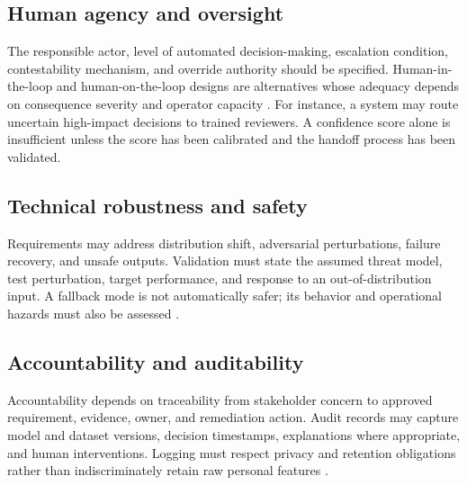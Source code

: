 \documentclass[11pt,a4paper]{article}
\begin{document}
\subsection{Human agency and oversight}
The responsible actor, level of automated decision-making, escalation condition, contestability mechanism, and override authority should be specified. Human-in-the-loop and human-on-the-loop designs are alternatives whose adequacy depends on consequence severity and operator capacity \cite{hleg2019}. For instance, a system may route uncertain high-impact decisions to trained reviewers. A confidence score alone is insufficient unless the score has been calibrated and the handoff process has been validated.

\subsection{Technical robustness and safety}
Requirements may address distribution shift, adversarial perturbations, failure recovery, and unsafe outputs. Validation must state the assumed threat model, test perturbation, target performance, and response to an out-of-distribution input. A fallback mode is not automatically safer; its behavior and operational hazards must also be assessed \cite{zhang2020}.

\subsection{Accountability and auditability}
Accountability depends on traceability from stakeholder concern to approved requirement, evidence, owner, and remediation action. Audit records may capture model and dataset versions, decision timestamps, explanations where appropriate, and human interventions. Logging must respect privacy and retention obligations rather than indiscriminately retain raw personal features \cite{mitchell2019,reisman2018}.
\end{document}
